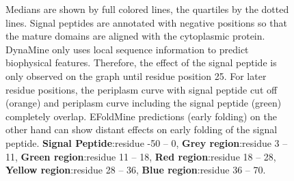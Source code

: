 \begin{figure}[h!]
{		Medians are shown by full colored lines,
		the quartiles by the dotted lines.
		Signal peptides are annotated with negative positions 
		so that the mature domains are aligned with the cytoplasmic protein.
		DynaMine only uses local sequence information to predict biophysical features.
		Therefore, the effect of the signal peptide is only observed on the graph until residue position 25.
		For later residue positions, the periplasm curve with signal peptide cut off (orange) and periplasm curve including the signal peptide (green) completely overlap.
		EFoldMine predictions (early folding) on the other hand can show distant effects on early folding of the signal peptide.
		\textbf{Signal Peptide}:residue -50 -- 0,
		\textbf{Grey region}:residue 3 -- 11,
		\textbf{Green region}:residue 11 -- 18,
		\textbf{Red region}:residue 18 -- 28,
		\textbf{Yellow region}:residue 28 -- 36,
		\textbf{Blue region}:residue 36 -- 70.
	}
	\label{fig:local_features}
~\end{figure}

